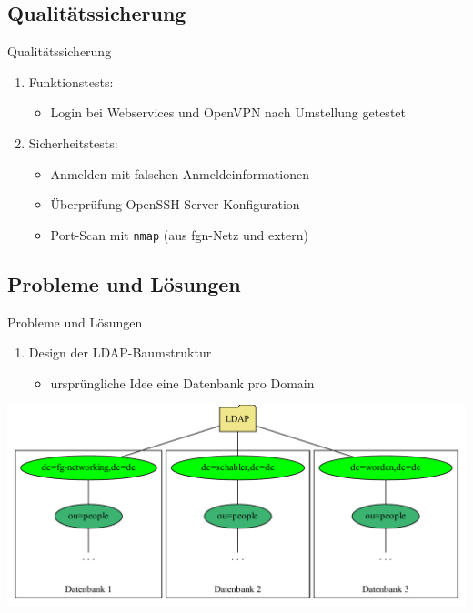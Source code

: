 \documentclass[presentation,svgnames,12pt]{beamer}
\begin{document}
\subsection{Qualitätssicherung}
\begin{frame}{Qualitätssicherung}
\begin{enumerate}
	\item Funktionstests:
	\vspace{6pt}
	\begin{itemize}
		\item Login bei Webservices und OpenVPN nach Umstellung getestet
	\end{itemize}
	\item Sicherheitstests:
	\vspace{6pt}
	\begin{itemize}
		\item Anmelden mit falschen Anmeldeinformationen
		\item Überprüfung OpenSSH-Server Konfiguration
		\item Port-Scan mit \texttt{nmap} (aus fgn-Netz und extern)
	\end{itemize}
\end{enumerate}
\end{frame}

\subsection{Probleme und Lösungen}
\begin{frame}{Probleme und Lösungen}
\begin{enumerate}
	\item Design der LDAP-Baumstruktur
	\vspace{6pt}
	\begin{itemize}
		\item ursprüngliche Idee eine Datenbank pro Domain
	\end{itemize}
\end{enumerate}
\vspace{2pt}
\centering
\includegraphics[width=\textwidth]{Bilder/LDAP-fgn-planned.pdf}
\end{frame}
\end{document}
